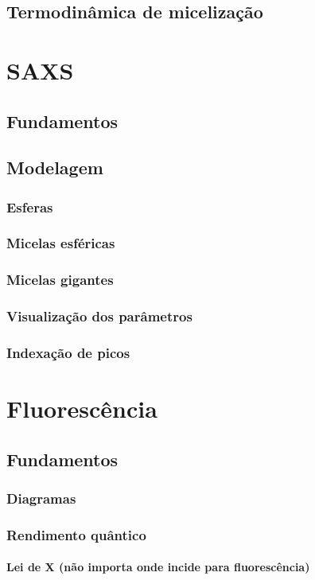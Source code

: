 		\section{Termodinâmica de micelização}
	\chapter{SAXS}
		\section{Fundamentos}
		\section{Modelagem}
			\subsection{Esferas}
			\subsection{Micelas esféricas}
			\subsection{Micelas gigantes}
			\subsection{Visualização dos parâmetros}
			\subsection{Indexação de picos}
	\chapter{Fluorescência}
		\section{Fundamentos}
			\subsection{Diagramas}
			\subsection{Rendimento quântico}
			\subsubsection{Lei de X (não importa onde incide para fluorescência)}
